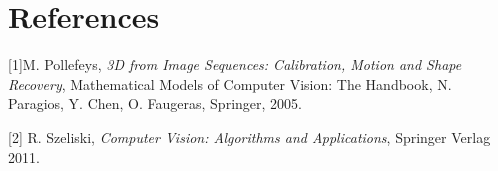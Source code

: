 \section*{References}

\begin{description}

\item{[1]}M. Pollefeys, \emph{3D from Image Sequences: Calibration, Motion and Shape Recovery}, Mathematical Models of Computer Vision: The Handbook, N. Paragios, Y. Chen, O. Faugeras, Springer, 2005.

\item{[2]} R. Szeliski, \emph{Computer Vision: Algorithms and Applications}, Springer Verlag 2011.
\end{description}

